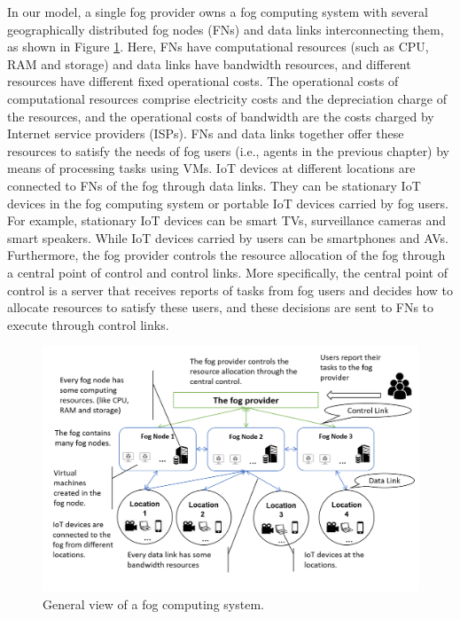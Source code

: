 \documentclass[11pt]{phdthesis}
\begin{document}
In our model, a single fog provider owns a fog computing system with several geographically distributed fog nodes (FNs) and data links interconnecting them, as shown in Figure \ref{fig:system_structure}. Here, FNs have computational resources (such as CPU, RAM and storage) and data links have bandwidth resources, and different resources have different fixed operational costs. The operational costs of computational resources comprise electricity costs and the depreciation charge of the resources, and the operational costs of bandwidth are the costs charged by Internet service providers (ISPs). FNs and data links together offer these resources to satisfy the needs of fog users (i.e., agents in the previous chapter) by means of processing tasks using VMs. 
IoT devices at different locations are connected to FNs of the fog through data links. They can be stationary IoT devices in the fog computing system or portable IoT devices carried by fog users. For example, stationary IoT devices can be smart TVs, surveillance cameras and smart speakers. While IoT devices carried by users can be smartphones and AVs. Furthermore, the fog provider controls the resource allocation of the fog through a central point of control and control links. More specifically, the central point of control is a server that receives reports of tasks from fog users and decides how to allocate resources to satisfy these users, and these decisions are sent to FNs to execute through control links.

\begin{figure}
    \centering
    \includegraphics[width=1.0\textwidth]{./Figures/system_structure.png}
    \caption{\label{fig:system_structure} General view of a fog computing system.}
\end{figure}
\end{document}
